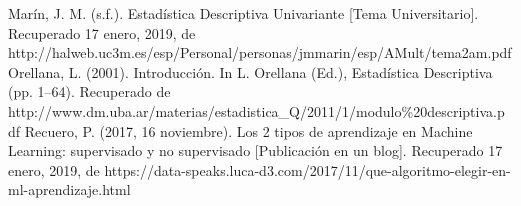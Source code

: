 \documentclass[spanish,12pt, a4paper,twoside]{paper}
\begin{document}
\begin{thebibliography}{00}
Marín, J. M. (s.f.). Estadística Descriptiva Univariante [Tema Universitario]. Recuperado 17 enero, 2019, de http://halweb.uc3m.es/esp/Personal/personas/jmmarin/esp/AMult/tema2am.pdf
Orellana, L. (2001). Introducción. In L. Orellana (Ed.), Estadística Descriptiva (pp. 1–64). Recuperado de http://www.dm.uba.ar/materias/estadistica\_Q/2011/1/modulo\%20descriptiva.pdf
Recuero, P. (2017, 16 noviembre). Los 2 tipos de aprendizaje en Machine Learning: supervisado y no supervisado [Publicación en un blog]. Recuperado 17 enero, 2019, de https://data-speaks.luca-d3.com/2017/11/que-algoritmo-elegir-en-ml-aprendizaje.html

\end{thebibliography}
\end{document}
